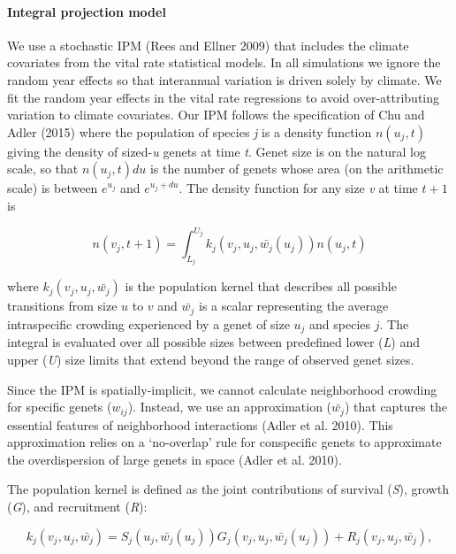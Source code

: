 \documentclass[12pt,]{article}
\begin{document}
\paragraph{Integral projection model}\label{integral-projection-model}

We use a stochastic IPM (Rees and Ellner 2009) that includes the climate
covariates from the vital rate statistical models. In all simulations we
ignore the random year effects so that interannual variation is driven
solely by climate. We fit the random year effects in the vital rate
regressions to avoid over-attributing variation to climate covariates.
Our IPM follows the specification of Chu and Adler (2015) where the
population of species \emph{j} is a density function \(n(u_{j},t)\)
giving the density of sized-\emph{u} genets at time \emph{t}. Genet size
is on the natural log scale, so that \(n(u_{j},t)du\) is the number of
genets whose area (on the arithmetic scale) is between \(e^{u_{j}}\) and
\(e^{u_{j}+du}\). The density function for any size \emph{v} at time
\(t+1\) is

\begin{equation}
n(v_{j},t+1) = \int_{L_{j}}^{U_{j}} k_{j}(v_{j},u_{j},\bar{w_{j}}(u_{j}))n(u_{j},t)
\end{equation}

where \(k_{j}(v_{j},u_{j},\bar{w_{j}})\) is the population kernel that
describes all possible transitions from size \(u\) to \(v\) and
\(\bar{w_{j}}\) is a scalar representing the average intraspecific
crowding experienced by a genet of size \(u_j\) and species \(j\). The
integral is evaluated over all possible sizes between predefined lower
(\emph{L}) and upper (\emph{U}) size limits that extend beyond the range
of observed genet sizes.

Since the IPM is spatially-implicit, we cannot calculate neighborhood
crowding for specific genets (\(w_{ij}\)). Instead, we use an
approximation (\(\bar{w_{j}}\)) that captures the essential features of
neighborhood interactions (Adler et al. 2010). This approximation relies
on a `no-overlap' rule for conspecific genets to approximate the
overdispersion of large genets in space (Adler et al. 2010).

The population kernel is defined as the joint contributions of survival
(\emph{S}), growth (\emph{G}), and recruitment (\emph{R}):

\begin{equation}
k_{j}(v_{j},u_{j},\bar{w_{j}}) = S_j(u_j, \bar{w_{j}}(u_{j}))G_j(v_{j},u_{j},\bar{w_{j}}(u_{j})) + R_j(v_{j},u_{j},\bar{w_{j}}),
\end{equation}
\end{document}

